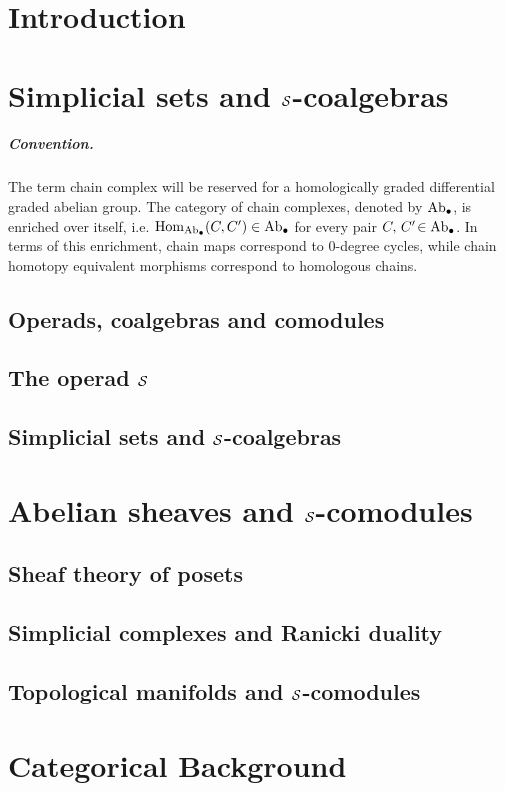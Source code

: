 \documentclass[12pt,oneside]{book}
\begin{document}
	\chapter*{Introduction}
	
	\chapter{Simplicial sets and $\S$-coalgebras}

	\paragraph{Convention.}\hspace*{-8pt}The term chain complex will be reserved for a homologically graded differential graded abelian group. The category of chain complexes, denoted by $\Ab_\bullet$, is enriched over itself, i.e. $\Hom_{\Ab_\bullet}(C,C')\in\Ab_\bullet$ for every pair $C,\,C'\!\in\Ab_\bullet$. In terms of this enrichment, chain maps correspond to $0$-degree cycles, while chain homotopy equivalent morphisms correspond to homologous chains.

	\section{Operads, coalgebras and comodules}
	

	\section{The operad $\S$}
	

	\section{Simplicial sets and $\S$-coalgebras}
	

	\chapter{Abelian sheaves and $\S$-comodules}

	\section{Sheaf theory of posets}
	

	\section{Simplicial complexes and Ranicki duality}
	

	\section{Topological manifolds and $\S$-comodules}
	

	\appendix
	\chapter{Categorical Background}
	

	
	
	\nocite{*}
\end{document}
